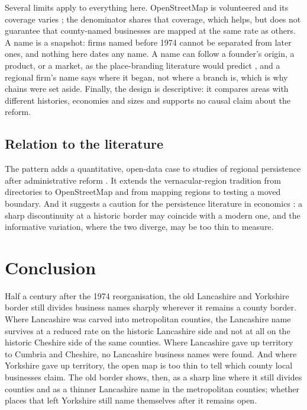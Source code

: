 \documentclass[11pt,a4paper]{article}
\begin{document}
Several limits apply to everything here. OpenStreetMap is volunteered and its coverage varies \citep{haklay2010}; the denominator shares that coverage, which helps, but does not guarantee that county-named businesses are mapped at the same rate as others. A name is a snapshot: firms named before 1974 cannot be separated from later ones, and nothing here dates any name. A name can follow a founder's origin, a product, or a market, as the place-branding literature would predict \citep{kavaratzis2005,pike2015}, and a regional firm's name says where it began, not where a branch is, which is why chains were set aside. Finally, the design is descriptive: it compares areas with different histories, economies and sizes and supports no causal claim about the reform.

\subsection{Relation to the literature}
The pattern adds a quantitative, open-data case to studies of regional persistence after administrative reform \citep{zimmerbauer2013,zimmerbauer2017,terlouw2016,terlouw2018}. It extends the vernacular-region tradition \citep{reed1976,zelinsky1980,liesch2015,sublett2021} from directories to OpenStreetMap and from mapping regions to testing a moved boundary. And it suggests a caution for the persistence literature in economics \citep{dell2010,becker2016,falck2012}: a sharp discontinuity at a historic border may coincide with a modern one, and the informative variation, where the two diverge, may be too thin to measure.

\section{Conclusion}\label{sec:conc}
Half a century after the 1974 reorganisation, the old Lancashire and Yorkshire border still divides business names sharply wherever it remains a county border. Where Lancashire was carved into metropolitan counties, the Lancashire name survives at a reduced rate on the historic Lancashire side and not at all on the historic Cheshire side of the same counties. Where Lancashire gave up territory to Cumbria and Cheshire, no Lancashire business names were found. And where Yorkshire gave up territory, the open map is too thin to tell which county local businesses claim. The old border shows, then, as a sharp line where it still divides counties and as a thinner Lancashire name in the metropolitan counties; whether places that left Yorkshire still name themselves after it remains open.
\end{document}
